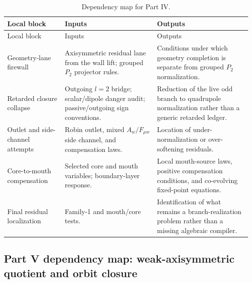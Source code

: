 \begin{longtable}{L{0.18\textwidth}L{0.29\textwidth}L{0.35\textwidth}}
\caption{Dependency map for Part IV.}\label{tab:dep-part-iv}\\
\toprule
Local block & Inputs & Outputs \\
\midrule
\endfirsthead
\toprule
Local block & Inputs & Outputs \\
\midrule
\endhead
Geometry-lane firewall & Axisymmetric residual lane from the wall lift; grouped \(P_2\) projector rules. & Conditions under which geometry completion is separate from grouped \(P_2\) normalization. \\
\addlinespace
Retarded closure collapse & Outgoing \(l=2\) bridge; scalar/dipole danger audit; passive/outgoing sign conventions. & Reduction of the live odd branch to quadrupole normalization rather than a generic retarded ledger. \\
\addlinespace
Outlet and side-channel attempts & Robin outlet, mixed \(A_w/F_{\mu w}\) side channel, and compensation laws. & Location of under-normalization or over-softening residuals. \\
\addlinespace
Core-to-mouth compensation & Selected core and mouth variables; boundary-layer response. & Local mouth-source laws, positive compensation conditions, and co-evolving fixed-point equations. \\
\addlinespace
Final residual localization & Family-1 and mouth/core tests. & Identification of what remains a branch-realization problem rather than a missing algebraic compiler. \\
\bottomrule
\end{longtable}

\subsection{Part V dependency map: weak-axisymmetric quotient and orbit closure}
\label{subsec:dep-part-v}

